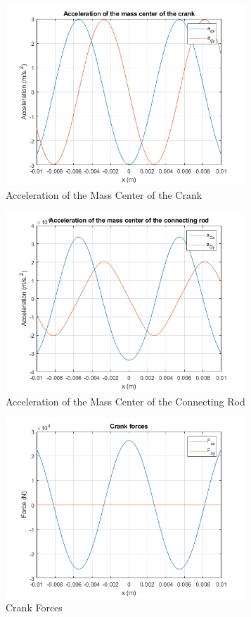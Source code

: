 \documentclass[12pt, titlepage]{article}
\begin{document}
\begin{figure}[H]
    \centering
    \includegraphics[width=0.8\textwidth]{./Images/7.png}
    \caption{Acceleration of the Mass Center of the Crank}
    \label{fig:accgc}
\end{figure}
\begin{figure}[H]
    \centering
    \includegraphics[width=0.8\textwidth]{./Images/8.png}
    \caption{Acceleration of the Mass Center of the Connecting Rod}
    \label{fig:accgcb}
\end{figure}
\begin{figure}[H]
    \centering
    \includegraphics[width=0.8\textwidth]{./Images/9.png}
    \caption{Crank Forces}
    \label{fig:crankforces}
\end{figure}
\end{document}
